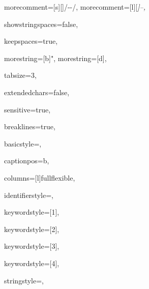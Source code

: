 {%
morecomment=[s][\color{commentcolor}]{/-}{-/},
morecomment=[l][\itshape \color{commentcolor}]{--},

showstringspaces=false,

keepspaces=true,

morestring=[b]",
morestring=[d],

tabsize=3,

extendedchars=false,

sensitive=true,

breaklines=true,

basicstyle=\ttfamily,

captionpos=b,

columns=[l]fullflexible,


identifierstyle={\ttfamily\color{black}},

keywordstyle=[1]{\ttfamily\color{keywordcolor}},

keywordstyle=[2]{\ttfamily\color{sortcolor}},

keywordstyle=[3]{\ttfamily\color{tacticcolor}},

keywordstyle=[4]{\ttfamily\color{attributecolor}},

stringstyle=\ttfamily,


}
